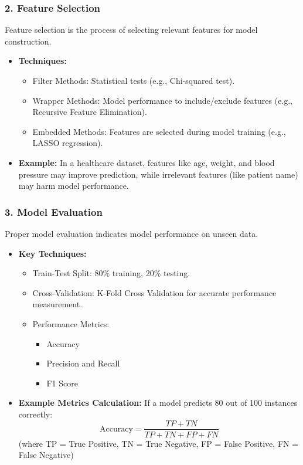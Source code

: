 \documentclass[aspectratio=169]{beamer}
\begin{document}
\begin{frame}[fragile]
    \frametitle{2. Feature Selection}
    Feature selection is the process of selecting relevant features for model construction.

    \begin{itemize}
        \item \textbf{Techniques:}
        \begin{itemize}
            \item Filter Methods: Statistical tests (e.g., Chi-squared test).
            \item Wrapper Methods: Model performance to include/exclude features (e.g., Recursive Feature Elimination).
            \item Embedded Methods: Features are selected during model training (e.g., LASSO regression).
        \end{itemize}

        \item \textbf{Example:} In a healthcare dataset, features like age, weight, and blood pressure may improve prediction, while irrelevant features (like patient name) may harm model performance.
    \end{itemize}
\end{frame}

\begin{frame}[fragile]
    \frametitle{3. Model Evaluation}
    Proper model evaluation indicates model performance on unseen data.

    \begin{itemize}
        \item \textbf{Key Techniques:}
        \begin{itemize}
            \item Train-Test Split: 80\% training, 20\% testing.
            \item Cross-Validation: K-Fold Cross Validation for accurate performance measurement.
            \item Performance Metrics: 
            \begin{itemize}
                \item Accuracy
                \item Precision and Recall
                \item F1 Score
            \end{itemize}
        \end{itemize}

        \item \textbf{Example Metrics Calculation:} 
        If a model predicts 80 out of 100 instances correctly:
        \begin{equation}
            \text{Accuracy} = \frac{TP + TN}{TP + TN + FP + FN} 
        \end{equation}
        (where TP = True Positive, TN = True Negative, FP = False Positive, FN = False Negative)
    \end{itemize}
\end{frame}
\end{document}
